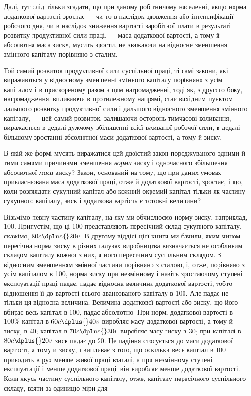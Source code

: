 
Далі, тут слід тільки згадати, що при даному робітничому населенні,
якщо норма додаткової вартості зростає — чи то в наслідок
здовження або інтенсифікації робочого дня, чи в наслідок зниження
вартості заробітної плати в результаті розвитку продуктивної
сили праці, — маса додаткової вартості, а тому й абсолютна
маса зиску, мусить зрости, не зважаючи на відносне
зменшення змінного капіталу порівняно з сталим.

Той самий розвиток продуктивної сили суспільної праці, ті самі
закони, які виражаються у відносному зменшенні змінного капіталу
порівняно з усім капіталом і в прискореному разом з цим нагромадженні,
тоді як, з другого боку, нагромадження, впливаючи
в протилежному напрямі, стає вихідним пунктом дальшого розвитку
продуктивної сили і дальшого відносного зменшення змінного
капіталу, — цей самий розвиток, залишаючи осторонь тимчасові
коливання, виражається в дедалі дужчому збільшенні
всієї вживаної робочої сили, в дедалі більшому зростанні абсолютної
маси додаткової вартості, а тому й зиску.

В якій же формі мусить виражатися цей двоїстий закон породжуваного
одними й тими самими причинами зменшення \emph{норми}
зиску і одночасного збільшення абсолютної \emph{маси} зиску? Закон,
оснований на тому, що при даних умовах привласнювана маса
додаткової праці, отже й додаткової вартості, зростає, і що, коли
розглядати сукупний капітал або кожний окремий капітал тільки
як частину сукупного капіталу, зиск і додаткова вартість є тотожні
величини?

Візьмімо певну частину капіталу, на яку ми обчислюємо
норму зиску, наприклад, 100. Припустім, що ці 100 представляють
пересічний склад сукупного капіталу, скажімо, $80c \dplus{} 20v$.
В другому відділі цієї книги ми бачили, яким чином пересічна
норма зиску в різних галузях виробництва визначається не особливим
складом капіталу кожної з них, а його пересічним суспільним
складом. З відносним зменшенням змінної частини порівняно
з сталою, і, отже, порівняно з усім капіталом в 100, норма зиску
при незмінному і навіть зростаючому ступені експлуатації праці
падає, падає відносна величина додаткової вартості, тобто відношення
її до вартості всього авансованого капіталу в 100.
Але падає не тільки ця відносна величина. Величина додаткової
вартості або зиску, що його вбирає весь капітал в 100, падає
абсолютно. При нормі додаткової вартості в 100\% капітал в
$60c \dplus{} 40v$ виробляє масу додаткової вартості, а тому й зиску,
в 40; капітал в $70c \dplus{} 30v$ виробляє масу зиску в  30; при капіталі
в $80c \dplus{} 20v$ зиск падає до 20. Це падіння стосується до
маси додаткової вартості, а тому й зиску, і випливає з того,
що оскільки весь капітал в 100 приводить в рух менше живої
праці взагалі, а при незмінному ступені експлуатації
і менше додаткової праці, він виробляє менше додаткової вартості.
Коли якусь частину суспільного капіталу, отже, капіталу
пересічного суспільного складу, взяти за одиницю міри для
\parbreak{}  %
